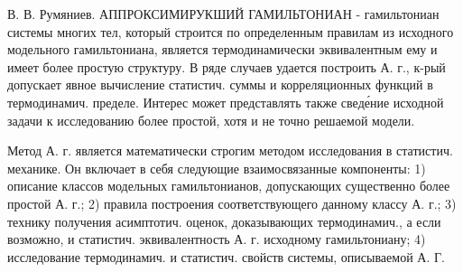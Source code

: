 \documentclass[10pt]{article}
\begin{document}
В. В. Румяниев. АППРОКСИМИРУКШИЙ ГАМИЛЬТОНИАН - гамильтониан системы многих тел, который строится по определенным правилам из исходного модельного гамильтониана, является термодинамически эквивалентным ему и имеет более простую структуру. В ряде случаев удается построить А. г., к-рый допускает явное вычисление статистич. суммы и корреляционных функций в термодинамич. пределе. Интерес может представлять также сведе́ние исходной задачи к исследованию более простой, хотя и не точно решаемой модели.



Метод А. г. является математически строгим методом исследования в статистич. механике. Он включает в себя следующие взаимосвязанные компоненты: 1) описание классов модельных гамильтонианов, допускающих существенно более простой А. г.; 2) правила построения соответствующего данному классу А. г.; 3) технику получения асимптотич. оценок, доказывающих термодинамич., а если возможно, и статистич. эквивалентность А. г. исходному гамильтониану; 4) исследование термодинамич. и статистич. свойств системы, описываемой А. Г.
\end{document}
